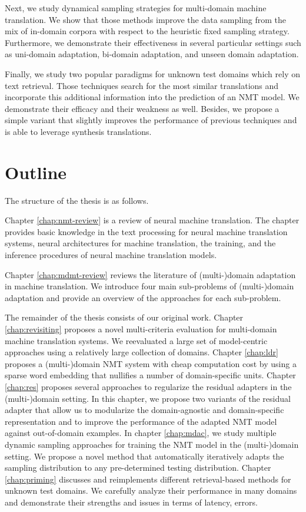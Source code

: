 Next, we study dynamical sampling strategies for multi-domain machine translation. We show that those methods improve the data sampling from the mix of in-domain corpora with respect to the heuristic fixed sampling strategy. Furthermore, we demonstrate their effectiveness in several particular settings such as uni-domain adaptation, bi-domain adaptation, and unseen domain adaptation.

Finally, we study two popular paradigms for unknown test domains which rely on text retrieval. Those techniques search for the most similar translations and incorporate this additional information into the prediction of an NMT model. We demonstrate their efficacy and their weakness as well. Besides, we propose a simple variant that slightly improves the performance of previous techniques and is able to leverage synthesis translations.

\section{Outline}
The structure of the thesis is as follows.

Chapter \ref{chap:nmt-review} is a review of neural machine translation. The chapter provides basic knowledge in the text processing for neural machine translation systems, neural architectures for machine translation, the training, and the inference procedures of neural machine translation models.

Chapter \ref{chap:mdmt-review} reviews the literature of (multi-)domain adaptation in machine translation. We introduce four main sub-problems of (multi-)domain adaptation and provide an overview of the approaches for each sub-problem.

The remainder of the thesis consists of our original work. Chapter \ref{chap:revisiting} proposes a novel multi-criteria evaluation for multi-domain machine translation systems. We reevaluated a large set of model-centric approaches using a relatively large collection of domains. Chapter \ref{chap:ldr} proposes a (multi-)domain NMT system with cheap computation cost by using a sparse word embedding that nullifies a number of domain-specific units. Chapter \ref{chap:res} proposes several approaches to regularize the residual adapters \citep{Bapna19simple} in the (multi-)domain setting. In this chapter, we propose two variants of the residual adapter that allow us to modularize the domain-agnostic and domain-specific representation and to improve the performance of the adapted NMT model against out-of-domain examples. In chapter \ref{chap:mdac}, we study multiple dynamic sampling approaches for training the NMT model in the (multi-)domain setting. We propose a novel method that automatically iteratively adapts the sampling distribution to any pre-determined testing distribution. Chapter \ref{chap:priming} discusses and reimplements different retrieval-based methods for unknown test domains. We carefully analyze their performance in many domains and demonstrate their strengths and issues in terms of latency, errors. 

